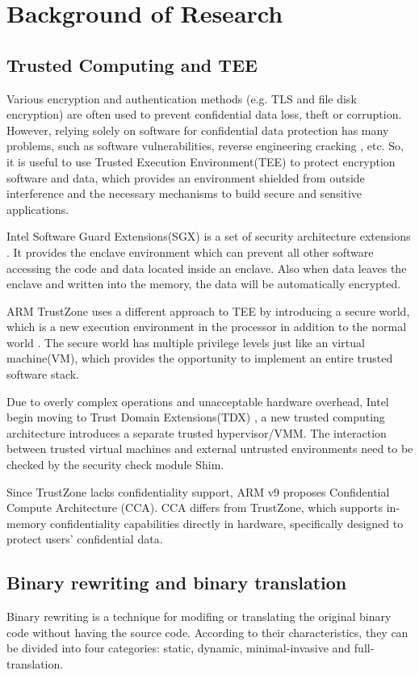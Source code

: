 \section{Background of Research}
\subsection{Trusted Computing and TEE}
Various encryption and authentication methods (e.g. TLS and file disk encryption)
are often used to prevent confidential data loss, theft or corruption.
However, relying solely on software for confidential data protection has many problems,
such as software vulnerabilities, reverse engineering cracking \cite{Zimba2021ARC}, etc.
So, it is useful to use Trusted Execution Environment(TEE) to protect encryption software
and data, which provides an environment shielded from outside interference and the necessary mechanisms
to build secure and sensitive applications.

Intel Software Guard Extensions(SGX) is a set of security architecture extensions 
\cite{McKeen2013InnovativeIA}.
It provides the enclave environment which can prevent all other software accessing the code
and data located inside an enclave. Also when data leaves the enclave and written into
the memory, the data will be automatically encrypted.

ARM TrustZone uses a different approach to TEE by introducing a secure world,
which is a new execution environment in the processor in addition to the normal world
\cite{Mukhtar2019ArchitecturesFS}. The secure world has multiple privilege levels just
like an virtual machine(VM), which provides the opportunity to implement an entire
trusted software stack.

Due to overly complex operations and unacceptable hardware overhead, Intel begin moving to
Trust Domain Extensions(TDX) \cite{Sahita2021SecurityAO, Sardar2021DemystifyingAI}, a new
trusted computing architecture introduces a separate trusted hypervisor/VMM. The interaction
between trusted virtual machines and external untrusted environments need to be checked by the
security check module Shim.

Since TrustZone lacks confidentiality support, ARM v9 proposes Confidential Compute Architecture (CCA).
CCA \cite{CCA} differs from TrustZone, which supports in-memory confidentiality capabilities directly in hardware,
specifically designed to protect users' confidential data.

\subsection{Binary rewriting and binary translation}
Binary rewriting is a technique for modifing or translating the original binary code
without having the source code. According to their characteristics, they can be divided
into four categories: static, dynamic, minimal-invasive and full-translation.

